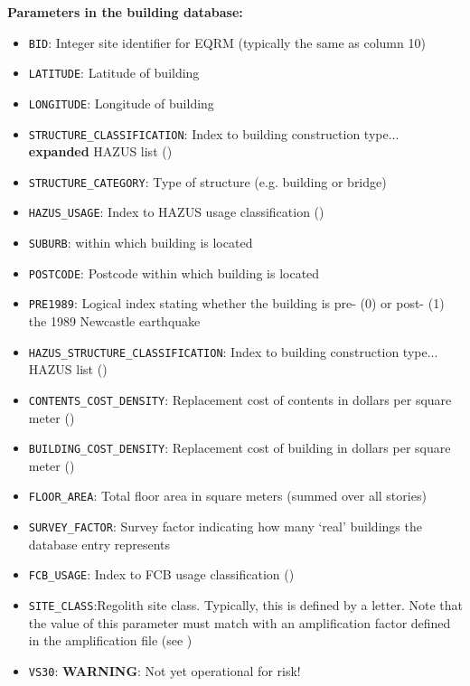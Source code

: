 \textbf{Parameters in the building database:}
\begin{itemize}
\item \texttt{BID}: Integer site identifier for EQRM (typically the same as column 10)
\item \texttt{LATITUDE}: Latitude of building 
\item \texttt{LONGITUDE}: Longitude of building 
\item \texttt{STRUCTURE\_CLASSIFICATION}: Index to building construction type... \textbf{expanded} HAZUS list ()
\item \texttt{STRUCTURE\_CATEGORY}: Type of structure (e.g. building or bridge)
\item \texttt{HAZUS\_USAGE}: Index to HAZUS usage classification () 
\item \texttt{SUBURB}: within which building is located 
\item \texttt{POSTCODE}: Postcode within which building is located 
\item \texttt{PRE1989}: Logical index stating whether the building is pre- (0) or post- (1) the 1989 Newcastle earthquake
\item \texttt{HAZUS\_STRUCTURE\_CLASSIFICATION}: Index to building construction type... HAZUS list ()
\item \texttt{CONTENTS\_COST\_DENSITY}: Replacement cost of contents in dollars per square meter ()
\item \texttt{BUILDING\_COST\_DENSITY}: Replacement cost of building in dollars per square meter ()
\item \texttt{FLOOR\_AREA}: Total floor area in square meters (summed over all stories)
\item \texttt{SURVEY\_FACTOR}: Survey factor indicating how many `real' buildings the database entry represents
\item \texttt{FCB\_USAGE}: Index to FCB usage classification ()
\item \texttt{SITE\_CLASS}:Regolith site class. Typically, this is defined
by a letter. Note that the value of this parameter must match with
an amplification factor defined in the amplification file (see
)
\item \texttt{VS30}: \textbf{WARNING}: Not yet operational for risk!
\end{itemize}


